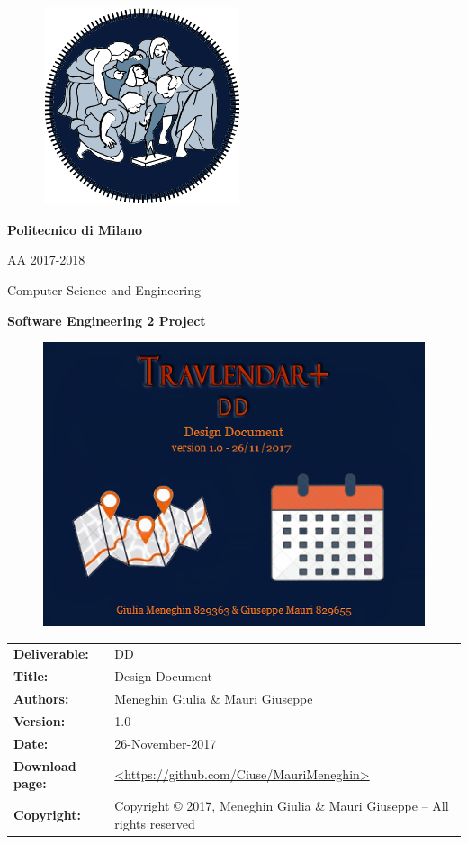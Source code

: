 \documentclass [12pt]{article}
\begin{document}
\begin{figure}[ht!]
\centering
\includegraphics[height=5.8cm,width=5.8cm]{logopoli.png}
\end{figure}
\begin{large}
\centerline{\textbf{Politecnico di Milano} }
\centerline{AA 2017-2018}
\vspace{0.5cm}
\centerline{Computer Science and Engineering}
\centerline{\textbf{Software Engineering 2 Project}}
\end{large}
\begin{figure}[ht!]
\centering
\includegraphics[width=\linewidth]{Immaginecopertina.png}
\end{figure} 

\clearpage

\begin{table}[h!]
\begin{tabu} to \textwidth { X[0.3,r,p] X[0.7,l,p] }
\hline

\textbf{Deliverable:} & DD\\
\textbf{Title:} & Design Document \\
\textbf{Authors:} & Meneghin Giulia \& Mauri Giuseppe \\
\textbf{Version:} & 1.0 \\ 
\textbf{Date:} & 26-November-2017 \\
\textbf{Download page:} & \url{<https://github.com/Ciuse/MauriMeneghin>} \\
\textbf{Copyright:} & Copyright © 2017, Meneghin Giulia \& Mauri Giuseppe – All rights reserved \\
\hline
\end{tabu}
\end{table}
\end{document}

